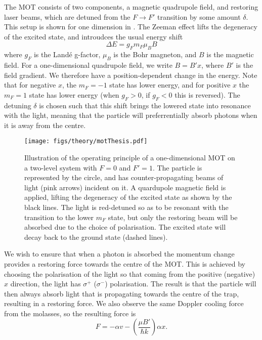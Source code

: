 The MOT consists of two components, a magnetic quadrupole field, and restoring
laser beams, which are detuned from the $F\rightarrow F'$ transition by some
amount $\delta$. This setup is shown for one dimension in . The Zeeman effect lifts the degeneracy of the excited state, and
introudces the usual energy shift~\cite{Binney}
%
\begin{equation}
  \Delta E = g_F m_F \mu_B B
\end{equation}
%
where $g_F$ is the Land\'e g-factor, $\mu_B$ is the Bohr magneton, and $B$ is
the magnetic field. For a one-dimensional quadrupole field, we write $B=B'x$,
where $B'$ is the field gradient. We therefore have a position-dependent change
in the energy. Note that for negative $x$, the $m_F=-1$ state has lower energy,
and for positive $x$ the $m_F=1$ state has lower energy (when $g_F>0$, if
$g_F<0$ this is reversed).
%
The detuning $\delta$ is chosen such that this shift brings the lowered state
into resonance with the light, meaning that the particle will preferrentially
absorb photons when it is away from the centre.

\begin{figure}[ht]
  \centering
  \texttt{[image: figs/theory/motThesis.pdf]}
  \caption{Illustration of the operating principle of a one-dimensional MOT on
    a two-level system with $F=0$ and $F'=1$. The particle is represented by
    the circle, and has counter-propagating beams of light (pink arrows)
    incident on it. A quardupole magnetic field is applied, lifting the
    degeneracy of the excited state as shown by the black lines. The light is
    red-detuned so as to be resonant with the transition to the lower $m_F$
    state, but only the restoring beam will be absorbed due to the choice of
    polarisation. The excited state will decay back to the ground state (dashed
    lines).
  }
  \label{theory:fig:MOT}
\end{figure}

We wish to ensure that when a photon is absorbed the momentum change provides a
restoring force towards the centre of the MOT. This is achieved by choosing the
polarisation of the light so that coming from the positive (negative) $x$
direction, the light has $\sigma^+$ ($\sigma^-$) polarisation. The result is
that the particle will then always absorb light that is propagating towards the
centre of the trap, resulting in a restoring force. We also observe the same
Doppler cooling force from the molasses, so the resulting force is
%
\begin{equation}
  F = - \alpha v - \left(\frac{\mu B'}{\hbar k}\right)\alpha x.
\end{equation}

